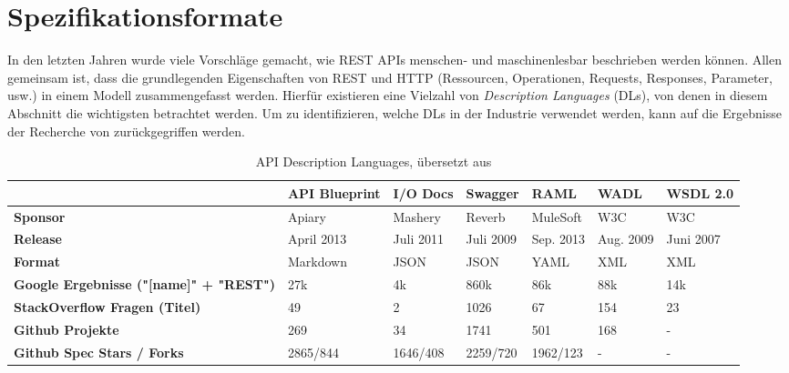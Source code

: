 
\section{Spezifikationsformate}

In den letzten Jahren wurde viele Vorschläge gemacht, wie REST APIs menschen- und maschinenlesbar beschrieben werden können. Allen gemeinsam ist, dass die grundlegenden Eigenschaften von REST und HTTP (Ressourcen, Operationen, Requests, Responses, Parameter, usw.) in einem Modell zusammengefasst werden. Hierfür existieren eine Vielzahl von \emph{Description Languages} (DLs), von denen in diesem Abschnitt die wichtigsten betrachtet werden. Um zu identifizieren, welche DLs in der Industrie verwendet werden, kann auf die Ergebnisse der Recherche von \textcite{scherer2016description} zurückgegriffen werden. 

\begin{table}[!htbp]
\caption{API Description Languages, übersetzt aus \textcite[38]{scherer2016description}}
\label{tab:dls}
\scriptsize
\begin{tabularx}{\linewidth}{|p{2cm}|X|X|X|X|X|X|}
	\hline
    ~ & \textbf{API Blueprint} & \textbf{I/O Docs} & \textbf{Swagger} & \textbf{RAML} & \textbf{WADL} & \textbf{WSDL 2.0} \\
    \hline
    \textbf{Sponsor} & Apiary & Mashery & Reverb & MuleSoft & W3C & W3C \\
    \hline
    \textbf{Release} & April 2013 & Juli 2011 & Juli 2009 & Sep. 2013 & Aug. 2009 & Juni 2007 \\
    \hline
    \textbf{Format} & Markdown & JSON & JSON & YAML & XML & XML \\
    \hline
    \textbf{Google Ergebnisse ("[name]" + "REST")} & 27k & 4k & 860k & 86k & 88k & 14k \\
    \hline
    \textbf{StackOverflow Fragen (Titel)} & 49 & 2 & 1026 & 67 & 154 & 23 \\
    \hline
    \textbf{Github Projekte} & 269 & 34 & 1741 & 501 & 168 & - \\
    \hline
    \textbf{Github Spec Stars / Forks} & 2865/844 & 1646/408 & 2259/720 & 1962/123 & - & - \\
    \hline
\end{tabularx}
\end{table}

